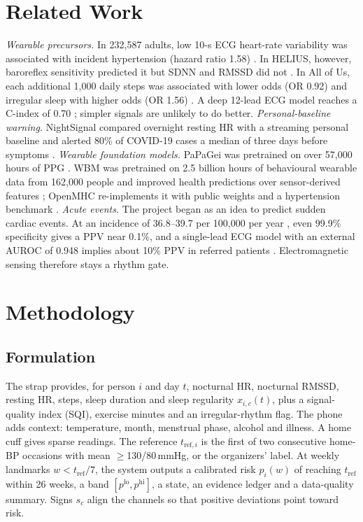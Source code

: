 \documentclass[conference]{IEEEtran}
\begin{document}
\section{Related Work}
\emph{Wearable precursors.} In 232,587 adults, low 10-s ECG heart-rate variability was associated with incident hypertension (hazard ratio 1.58) \cite{kang2022}. In HELIUS, however, baroreflex sensitivity predicted it but SDNN and RMSSD did not \cite{bouwmeester2025}. In All of Us, each additional 1,000 daily steps was associated with lower odds (OR 0.92) \cite{master2022} and irregular sleep with higher odds (OR 1.56) \cite{zheng2024}. A deep 12-lead ECG model reaches a C-index of 0.70 \cite{sau2025}; simpler signals are unlikely to do better. \emph{Personal-baseline warning.} NightSignal compared overnight resting HR with a streaming personal baseline and alerted 80\% of COVID-19 cases a median of three days before symptoms \cite{alavi2022}. \emph{Wearable foundation models.} PaPaGei was pretrained on over 57,000 hours of PPG \cite{papagei2025}. WBM was pretrained on 2.5 billion hours of behavioural wearable data from 162,000 people and improved health predictions over sensor-derived features \cite{erturk2025}; OpenMHC re-implements it with public weights and a hypertension benchmark \cite{openmhc2026}. \emph{Acute events.} The project began as an idea to predict sudden cardiac events. At an incidence of 36.8--39.7 per 100,000 per year \cite{empana2022}, even 99.9\% specificity gives a PPV near 0.1\%, and a single-lead ECG model with an external AUROC of 0.948 implies about 10\% PPV in referred patients \cite{fiorina2025}. Electromagnetic sensing therefore stays a rhythm gate.

\section{Methodology}
\subsection{Formulation}
The strap provides, for person $i$ and day $t$, nocturnal HR, nocturnal RMSSD, resting HR, steps, sleep duration and sleep regularity $x_{i,c}(t)$, plus a signal-quality index (SQI), exercise minutes and an irregular-rhythm flag. The phone adds context: temperature, month, menstrual phase, alcohol and illness. A home cuff gives sparse readings. The reference $t_{\mathrm{ref},i}$ is the first of two consecutive home-BP occasions with mean $\geq$130/80\,mmHg, or the organizers' label. At weekly landmarks $w<t_{\mathrm{ref}}/7$, the system outputs a calibrated risk $p_i(w)$ of reaching $t_{\mathrm{ref}}$ within 26 weeks, a band $[p^{\mathrm{lo}},p^{\mathrm{hi}}]$, a state, an evidence ledger and a data-quality summary. Signs $s_c$ align the channels so that positive deviations point toward risk.
\end{document}
